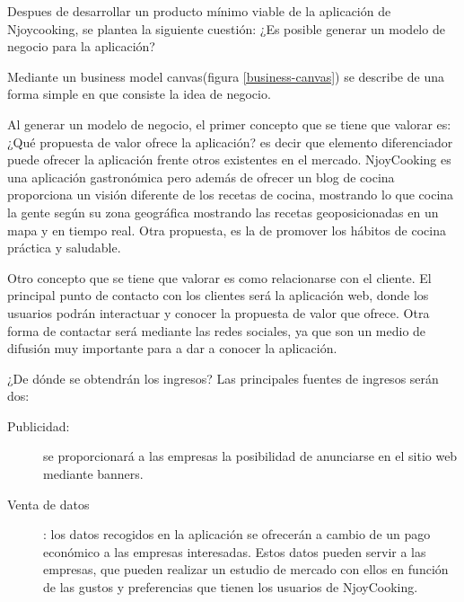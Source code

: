 Despues de desarrollar un producto mínimo viable de la aplicación de Njoycooking, se plantea la siguiente cuestión: ¿Es posible generar un modelo de negocio para la aplicación?

Mediante un business model canvas(figura \ref{business-canvas}) se describe de una forma simple en que consiste la idea de negocio.

\vspace{5 mm}

Al generar un modelo de negocio, el primer concepto que se tiene que valorar es: ¿Qué propuesta de valor ofrece la aplicación? es decir que elemento diferenciador puede ofrecer la aplicación frente otros existentes en el mercado. NjoyCooking es una aplicación gastronómica pero además de ofrecer un blog de cocina proporciona un visión diferente de los recetas de cocina, mostrando lo que cocina la gente según su zona geográfica mostrando las recetas geoposicionadas en un mapa y en tiempo real. Otra propuesta, es la de promover los hábitos de cocina práctica y saludable.


\vspace{5 mm}

Otro concepto que se tiene que valorar es como relacionarse con el cliente. El principal punto de contacto con los clientes será la aplicación web, donde los usuarios podrán interactuar y conocer la propuesta de valor que ofrece. Otra forma de contactar será mediante las redes sociales, ya que son un medio de difusión muy importante para a dar a conocer la aplicación.

\vspace{5 mm}

¿De dónde se obtendrán los ingresos? Las principales fuentes de ingresos serán dos:

\begin{description}

\item [Publicidad:] se proporcionará a las empresas la posibilidad de anunciarse en el sitio web mediante banners.

\item [Venta de datos]: los datos recogidos en la aplicación se ofrecerán a cambio de un pago económico a las empresas interesadas. Estos datos pueden servir a las empresas, que pueden realizar un estudio de mercado con ellos en función de las gustos y preferencias que tienen los usuarios de NjoyCooking.

\end{description}

